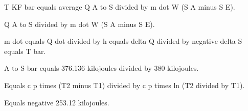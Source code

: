 T KF bar equals average Q A to S divided by m dot W (S A minus S E).  

Q A to S divided by m dot W (S A minus S E).  

m dot equals Q dot divided by h equals delta Q divided by negative delta S equals T bar.  

A to S bar equals 376.136 kilojoules divided by 380 kilojoules.  

Equals c p times (T2 minus T1) divided by c p times ln (T2 divided by T1).  

Equals negative 253.12 kilojoules.